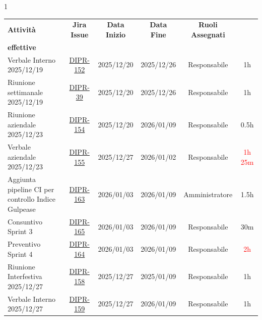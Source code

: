 \documentclass[a4paper,12pt]{article}
\begin{document}
    \small
    \begin{spacing}{1}
        \begin{longtable}{|p{4cm}|c|c|c|c|c|}
            \hline
            \rowcolor{zpusgreen!30}
            \textbf{Attività} & \textbf{Jira Issue} & \textbf{Data Inizio} & \textbf{Data Fine} & \textbf{Ruoli Assegnati} & \begin{tabular}[c]{@{}c@{}} \textbf{Ore} \\ \textbf{effettive} \end{tabular} \\
            \hline
            Verbale Interno 2025/12/19 & \href{https://7zpus.atlassian.net/browse/DIPR-152}{DIPR-152}& 2025/12/20 & 2025/12/26 & Responsabile & 1h \\
            \hline
            Riunione settimanale 2025/12/19 & \href{https://7zpus.atlassian.net/browse/DIPR-39}{DIPR-39} & 2025/12/20 & 2025/12/26 & Responsabile & 1h \\
            \hline
            Riunione aziendale 2025/12/23 & \href{https://7zpus.atlassian.net/browse/DIPR-154}{DIPR-154} & 2025/12/20 & 2026/01/09 & Responsabile & 0.5h \\
            \hline
            Verbale aziendale 2025/12/23 & \href{https://7zpus.atlassian.net/browse/DIPR-155}{DIPR-155}  & 2025/12/27 & 2026/01/02 & Responsabile & \textcolor{red}{1h 25m} \\
            \hline
            Aggiunta pipeline CI per controllo Indice Gulpease & \href{https://7zpus.atlassian.net/browse/DIPR-163}{DIPR-163} & 2026/01/03 & 2026/01/09 & Amministratore & 1.5h \\
            \hline
            Consuntivo Sprint 3 & \href{https://7zpus.atlassian.net/browse/DIPR-165}{DIPR-165} & 2026/01/03 & 2026/01/09 & Responsabile & \textcolor{green!50!black}{30m} \\
            \hline
            Preventivo Sprint 4 & \href{https://7zpus.atlassian.net/browse/DIPR-164}{DIPR-164} & 2026/01/03 & 2026/01/09 & Responsabile & \textcolor{red}{2h}\\
            \hline
            Riunione Interfestiva 2025/12/27 & \href{https://7zpus.atlassian.net/browse/DIPR-158}{DIPR-158} & 2025/12/27 & 2025/01/09 & Responsabile & 1h \\
            \hline
            Verbale Interno 2025/12/27 & \href{https://7zpus.atlassian.net/browse/DIPR-159}{DIPR-159} & 2025/12/27 & 2026/01/09 & Responsabile & 1h \\

\end{longtable}
\end{spacing}
\end{document}
